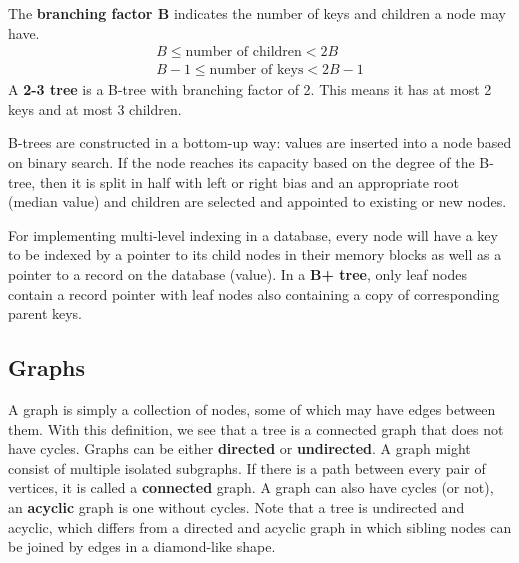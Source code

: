 \documentclass{article}
\begin{document}
    The \textbf{branching factor B} indicates the number of keys and children a node may have.
    \begin{align*}
        B \leq \text{number of children} < 2B \\
        B - 1 \leq \text{number of keys} < 2B - 1
    \end{align*}
    A \textbf{2-3 tree} is a B-tree with branching factor of 2. This means it has at most 2 keys and at most 3 children. 
    
    B-trees are constructed in a bottom-up way: values are inserted into a node based on binary search. If the node reaches its capacity based on the degree of the B-tree, then it is split in half with left or right bias and an appropriate root (median value) and children are selected and appointed to existing or new nodes.
    
    For implementing multi-level indexing in a database, every node will have a key to be indexed by a pointer to its child nodes in their memory blocks as well as a pointer to a record on the database (value). In a \textbf{B+ tree}, only leaf nodes contain a record pointer with leaf nodes also containing a copy of corresponding parent keys.
    
    \subsection{Graphs}
    A graph is simply a collection of nodes, some of which may have edges between them. With this definition, we see that a tree is a connected graph that does not have cycles. Graphs can be either \textbf{directed} or \textbf{undirected}. A graph might consist of multiple isolated subgraphs. If there is a path between every pair of vertices, it is called a \textbf{connected} graph. A graph can also have cycles (or not), an \textbf{acyclic} graph is one without cycles. Note that a tree is undirected and acyclic, which differs from a directed and acyclic graph in which sibling nodes can be joined by edges in a diamond-like shape.
    
\end{document}
